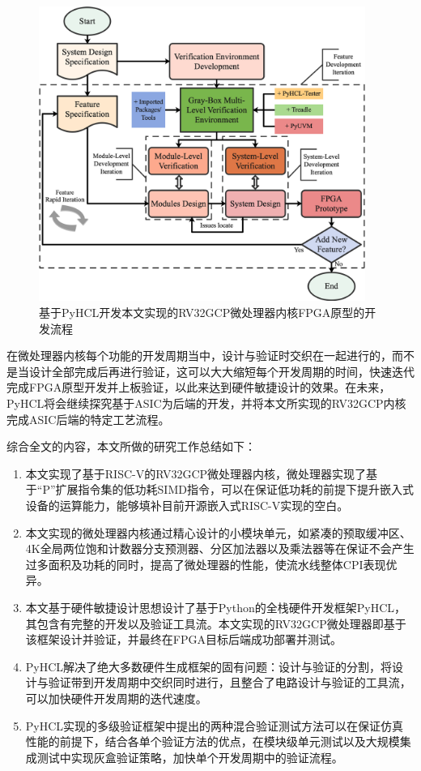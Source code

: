 \begin{figure}[htbp]
	\centering
	\includegraphics[width=0.95\textwidth]{Photos/process.png}
	\caption{基于PyHCL开发本文实现的RV32GCP微处理器内核FPGA原型的开发流程}
\end{figure}

在微处理器内核每个功能的开发周期当中，设计与验证时交织在一起进行的，而不是当设计全部完成后再进行验证，这可以大大缩短每个开发周期的时间，快速迭代完成FPGA原型开发并上板验证，以此来达到硬件敏捷设计的效果。在未来，PyHCL将会继续探究基于ASIC为后端的开发，并将本文所实现的RV32GCP内核完成ASIC后端的特定工艺流程。

综合全文的内容，本文所做的研究工作总结如下：

\begin{enumerate}
	\item 本文实现了基于RISC-V的RV32GCP微处理器内核，微处理器实现了基于“P”扩展指令集的低功耗SIMD指令，可以在保证低功耗的前提下提升嵌入式设备的运算能力，能够填补目前开源嵌入式RISC-V实现的空白。
	\item 本文实现的微处理器内核通过精心设计的小模块单元，如紧凑的预取缓冲区、4K全局两位饱和计数器分支预测器、分区加法器以及乘法器等在保证不会产生过多面积及功耗的同时，提高了微处理器的性能，使流水线整体CPI表现优异。
	\item 本文基于硬件敏捷设计思想设计了基于Python的全栈硬件开发框架PyHCL，其包含有完整的开发以及验证工具流。本文实现的RV32GCP微处理器即基于该框架设计并验证，并最终在FPGA目标后端成功部署并测试。
	\item PyHCL解决了绝大多数硬件生成框架的固有问题：设计与验证的分割，将设计与验证带到开发周期中交织同时进行，且整合了电路设计与验证的工具流，可以加快硬件开发周期的迭代速度。
	\item PyHCL实现的多级验证框架中提出的两种混合验证测试方法可以在保证仿真性能的前提下，结合各单个验证方法的优点，在模块级单元测试以及大规模集成测试中实现灰盒验证策略，加快单个开发周期中的验证流程。
\end{enumerate}